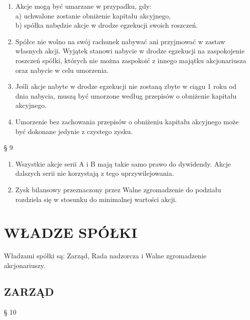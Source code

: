 \documentclass[a4paper, 11pt]{article}
\begin{document}
\begin{enumerate}
\item Akcje mogą być umarzane w przypadku, gdy:\\
a)	uchwalone zostanie obniżenie kapitału akcyjnego,\\
b)	spółka nabędzie akcje w drodze egzekucji swoich roszczeń.\\

\item	Spółce nie wolno na swój rachunek nabywać ani przyjmować w zastaw własnych akcji. Wyjątek stanowi nabycie w drodze egzekucji na zaspokojenie roszczeń spółki, których nie można zaspokoić z innego majątku akcjonariusza oraz nabycie w celu umorzenia.
\item	Jeśli akcje nabyte w drodze egzekucji nie zostaną zbyte w ciągu 1 roku od dnia nabycia, muszą być umorzone według przepisów o obniżenie kapitału akcyjnego.
\item	Umorzenie bez zachowania przepisów o obniżeniu kapitału akcyjnego może być dokonane jedynie z czystego zysku.
\end{enumerate}
§ 9\\

\begin{enumerate}
\item	Wszystkie akcje serii A i B mają takie samo prawo do dywidendy. Akcje dalszych serii nie korzystają z tego uprzywilejowania.
\item	Zysk bilansowy przeznaczony przez Walne zgromadzenie do podziału rozdziela się w stosunku do minimalnej wartości akcji.
\end{enumerate}
\section{WŁADZE SPÓŁKI}

Władzami spółki są: Zarząd, Rada nadzorcza i Walne zgromadzenie akcjonariuszy.\\

\subsection{ZARZĄD}

§ 10\\
\end{document}

